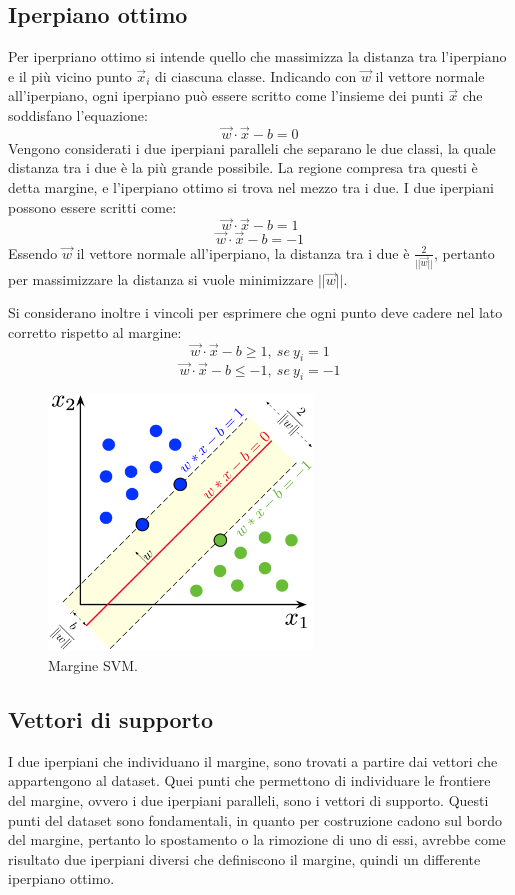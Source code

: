 \documentclass[oneside]{book}
\begin{document}


\subsection{Iperpiano ottimo}
Per iperpriano ottimo si intende quello che massimizza la distanza tra l'iperpiano e il più vicino punto $\vec{x}_i$ di ciascuna classe. Indicando con $\vec{w}$ il vettore normale all'iperpiano, ogni iperpiano può essere scritto come l'insieme dei punti $\vec{x}$ che soddisfano l'equazione:
$$\vec{w}\cdot\vec{x} - b = 0$$
Vengono considerati i due iperpiani paralleli che separano le due classi, la quale distanza tra i due è la più grande possibile. La regione compresa tra questi è detta margine, e l'iperpiano ottimo si trova nel mezzo tra i due. I due iperpiani possono essere scritti come:
$$\vec{w}\cdot\vec{x} - b = 1$$
$$\vec{w}\cdot\vec{x} - b = - 1$$
Essendo $\vec{w}$ il vettore normale all'iperpiano, la distanza tra i due è $\frac{2}{||\vec{w}||}$, pertanto per massimizzare la distanza si vuole minimizzare $ ||\vec{w}||$.

Si considerano inoltre i vincoli per esprimere che ogni punto deve cadere nel lato corretto rispetto al margine:
$$\vec{w}\cdot\vec{x} - b \geq 1,\ se\ y_i = 1$$
$$\vec{w}\cdot\vec{x} - b \leq - 1,\ se\ y_i = -1$$


\begin{figure}[h!]
	\centering
	\includegraphics[width=7cm]{assets/svm-margin.png}
	\caption[Caption for LOF]{Margine SVM.\footnotemark}
	\label{fig:svm-margin}
\end{figure}



\subsection{Vettori di supporto}
I due iperpiani che individuano il margine, sono trovati a partire dai vettori che appartengono al dataset. Quei punti che permettono di individuare le frontiere del margine, ovvero i due iperpiani paralleli, sono i vettori di supporto. Questi punti del dataset sono fondamentali, in quanto per costruzione cadono sul bordo del margine, pertanto lo spostamento o la rimozione di uno di essi, avrebbe come risultato due iperpiani diversi che definiscono il margine, quindi un differente iperpiano ottimo.
\end{document}
